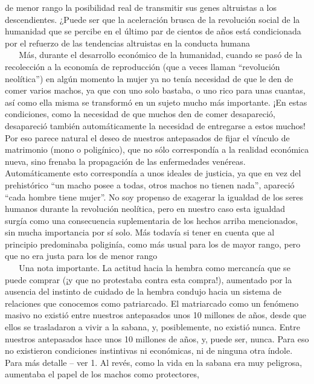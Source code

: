 de menor rango la posibilidad real de transmitir sus genes altruistas a
los descendientes. ¿Puede ser que la aceleración brusca de la revolución
social de la humanidad que se percibe en el último par de cientos de
años está condicionada por el refuerzo de las tendencias altruistas en
la conducta humana\\
\hspace*{0.333em} ~ ~ Más, durante el desarrollo económico de la
humanidad, cuando se pasó de la recolección a la economía de
reproducción (que a veces llaman ``revolución neolítica'') en algún
momento la mujer ya no tenía necesidad de que le den de comer varios
machos, ya que con uno solo bastaba, o uno rico para unas cuantas, así
como ella misma se transformó en un sujeto mucho más importante. ¡En
estas condiciones, como la necesidad de que muchos den de comer
desapareció, desapareció también automáticamente la necesidad de
entregarse a estos muchos! Por eso parece natural el deseo de nuestros
antepasados de fijar el vínculo de matrimonio (mono o poligínico), que
no sólo correspondía a la realidad económica nueva, sino frenaba la
propagación de las enfermedades venéreas. Automáticamente esto
correspondía a unos ideales de justicia, ya que en vez del prehistórico
``un macho posee a todas, otros machos no tienen nada'', apareció ``cada
hombre tiene mujer''. No soy propenso de exagerar la igualdad de los
seres humanos durante la revolución neolítica, pero en nuestro caso esta
igualdad surgía como una consecuencia suplementaria de los hechos arriba
mencionados, sin mucha importancia por sí solo. Más todavía si tener en
cuenta que al principio predominaba poliginía, como más usual para los
de mayor rango, pero que no era justa para los de menor rango\\
\hspace*{0.333em} ~ ~ Una nota importante. La actitud hacia la hembra
como mercancía que se puede comprar (¡y que no protestaba contra esta
compra!), aumentado por la ausencia del instinto de cuidado de la hembra
condujo hacia un sistema de relaciones que conocemos como patriarcado.
El matriarcado como un fenómeno masivo no existió entre nuestros
antepasados unos 10 millones de años, desde que ellos se trasladaron a
vivir a la sabana, y, posiblemente, no existió nunca. Entre nuestros
antepasados hace unos 10 millones de años, y, puede ser, nunca. Para eso
no existieron condiciones instintivas ni económicas, ni de ninguna otra
índole. Para más detalle -- ver 1. Al revés, como la vida en la sabana
era muy peligrosa, aumentaba el papel de los machos como protectores,
